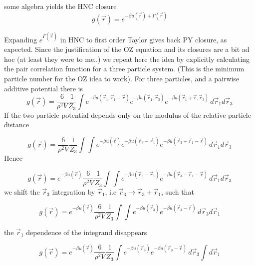 \documentclass[11pt,a4paper]{article}
\begin{document}
some algebra yields the HNC closure
\begin{equation}
g(\vec r) = e^{- \beta u(\vec r) + \Gamma(\vec r) }
\end{equation}

Expanding $e^{\Gamma(\vec r) }$ in HNC to first order Taylor gives back PY closure, as expected.\newline
Since the justification of the OZ equation and its closures are a bit ad hoc (at least they were to me..) we repeat here the
idea by explicitly calculating the pair correlation function for a three particle system. (This is the minimum particle
number for the OZ idea to work). For three particles, and a pairwise additive potential there is
\begin{equation}
g(\vec r) = \frac{6}{\rho^2 V}\frac{1}{Z_3} \int
e^{- \beta u(\vec r_1, \vec r_1 + \vec r) }
e^{- \beta u(\vec r_1, \vec r_3) }
e^{- \beta u(\vec r_1 + \vec r, \vec r_3) }
\,
d\vec r_1
d\vec r_3
\end{equation}
If the two particle potential depends only on the modulus of the relative particle distance

\begin{equation}
g(\vec r) = \frac{6}{\rho^2 V}\frac{1}{Z_3} \int \int
e^{- \beta u( \vec r) }
e^{- \beta u(\vec r_3 - \vec r_1) }
e^{- \beta u(\vec r_3 - \vec r_1 - \vec r) }
\,
d\vec r_1
d\vec r_3
\end{equation}
Hence

\begin{equation}
g(\vec r) = e^{- \beta u( \vec r) }
\frac{6}{\rho^2 V}\frac{1}{Z_3} \int \int
e^{- \beta u(\vec r_3 - \vec r_1) }
e^{- \beta u(\vec r_3 - \vec r_1 - \vec r) }
\,
d\vec r_1
d\vec r_3
\end{equation}
we shift the $\vec r_3$ integration by $\vec r_1$, i.e $\vec r_3 \rightarrow \vec r_3 + \vec r_1$, such that

\begin{equation}
g(\vec r) = e^{- \beta u( \vec r) }
\frac{6}{\rho^2 V}\frac{1}{Z_3} \int  \int
e^{- \beta u(\vec r_3) }
e^{- \beta u(\vec r_3 - \vec r) }
\,
d\vec r_3
d\vec r_1
\end{equation}

the $\vec r_1$ dependence of the integrand disappears

\begin{equation}
g(\vec r) = e^{- \beta u( \vec r) }
\frac{6}{\rho^2 V}\frac{1}{Z_3} \int  
e^{- \beta u(\vec r_3) }
e^{- \beta u(\vec r_3 - \vec r) }
\,
d\vec r_3
\int d\vec r_1
\end{equation}
\end{document}

